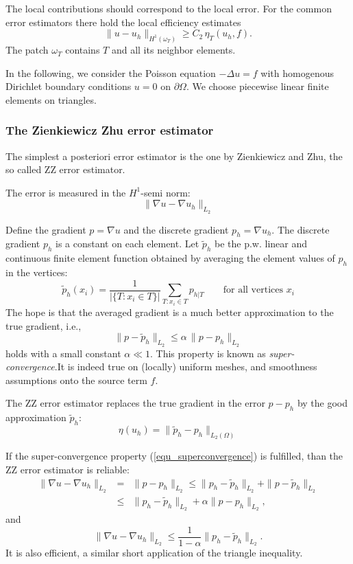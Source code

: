 The local contributions should correspond to the local error. For
the common error estimators there hold the local efficiency estimates
$$
\| u - u_h \|_{H^1(\omega_T)} \geq C_2 \, \eta_T(u_h, f).
$$
The patch $\omega_T$ contains $T$ and all its neighbor elements.

\bigskip

In the following, we consider the Poisson equation $-\Delta u = f$ with
homogenous Dirichlet boundary conditions $u = 0$ on $\partial \Omega$. We choose
piecewise linear finite elements on triangles.

\subsubsection{The Zienkiewicz Zhu error estimator}
The simplest a posteriori error estimator is the one by
Zienkiewicz and Zhu, the so called ZZ error estimator.

The error is measured in the $H^1$-semi norm:
$$
\| \nabla u - \nabla u_h \|_{L_2}
$$

Define the gradient $p = \nabla u$ and the discrete gradient $p_h = \nabla u_h$. 
The discrete gradient $p_h$ is a constant on each element. 
Let $\tilde p_h$ be the p.w. linear and continuous
finite element function obtained by averaging the element values of $p_h$ in the vertices:
$$
\tilde p_h(x_i) = \frac{1}{ | \{ T : x_i \in T \} |} \sum_{T : x_i \in T} 
        p_{h|T}
\qquad \mbox{for all vertices } x_i
$$
The hope is that the averaged gradient is a much better approximation to the true gradient,
i.e.,
\begin{equation}
\label{equ_superconvergence}
\| p - \tilde p_h \|_{L_2} \leq \alpha \, \| p - p_h \|_{L_2}
\end{equation}
holds with a small constant $\alpha \ll 1$. This property is known as {\em super-convergence}.It is indeed true on (locally) uniform meshes, and smoothness assumptions onto the source term $f$. 

The ZZ error estimator replaces the true gradient in the error $p-p_h$ by the good approximation $\tilde p_h$:
$$
\eta (u_h) = \| \tilde p_h - p_h \|_{L_2(\Omega)}
$$

If the super-convergence property (\ref{equ_superconvergence}) is fulfilled, 
than the ZZ error estimator is reliable:
\begin{eqnarray*}
\| \nabla u - \nabla u_h \|_{L_2} & = & \| p - p_h \|_{L_2} \leq 
        \| p_h - \widetilde p_h \|_{L_2} + \| p - \widetilde p_h \|_{L_2} \\
        & \leq & \| p_h - \widetilde p_h \|_{L_2} + \alpha \| p - p_h \|_{L_2},
\end{eqnarray*}
and
$$
\| \nabla u - \nabla u_h \|_{L_2} \leq \frac{1}{1-\alpha} \| p_h - \widetilde p_h \|_{L_2}.
$$
It is also efficient, a similar short application of the triangle inequality.

